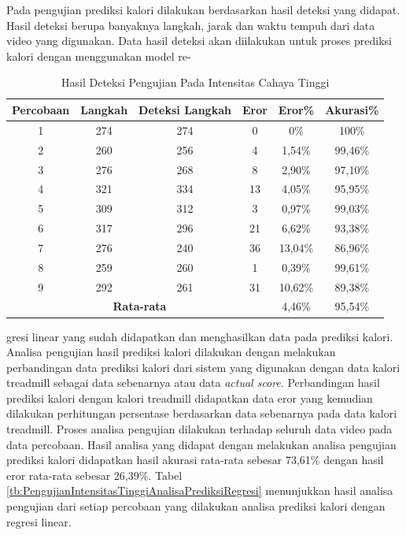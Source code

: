 Pada pengujian prediksi kalori dilakukan berdasarkan hasil deteksi yang didapat. Hasil deteksi berupa banyaknya langkah, jarak dan waktu tempuh dari data video yang digunakan. Data hasil deteksi akan diilakukan untuk proses prediksi kalori dengan menggunakan model re- 

\begin{longtable}{|c|c|c|c|c|c|}
  \caption{Hasil Deteksi Pengujian Pada Intensitas Cahaya Tinggi}
  \label{tb:PengujianIntensitasTinggiAnalisaDeteksi}                                   \\
  \hline
  \rowcolor[HTML]{C0C0C0}
  \textbf{Percobaan} & \textbf{Langkah} & \textbf{Deteksi Langkah} & \textbf{Eror} & \textbf{Eror\%} & \textbf{Akurasi\%} \\
  \hline
  1   & 274   & 274 & 0    & 0\%        & 100\%   \\
  \hline
  2   & 260   & 256 & 4    & 1,54\%     & 99,46\%   \\
  \hline
  3   & 276   & 268 & 8    & 2,90\%     & 97,10\%     \\
  \hline
  4   & 321   & 334 & 13   & 4,05\%     & 95,95\%   \\
  \hline
  5   & 309   & 312 & 3    & 0,97\%     & 99,03\%   \\
  \hline
  6   & 317   & 296 & 21   & 6,62\%     & 93,38\%   \\
  \hline
  7   & 276   & 240 & 36   & 13,04\%    & 86,96\%   \\
  \hline
  8   & 259   & 260 & 1    & 0,39\%     & 99,61\%   \\
  \hline
  9   & 292   & 261 & 31   & 10,62\%    & 89,38\%   \\
  \hline
  

  \multicolumn{4}{|c|}{\textbf{Rata-rata}} & 4,46\% & 95,54\% \\
  \hline
\end{longtable}

\noindent
gresi linear yang sudah didapatkan dan menghasilkan data pada prediksi kalori. Analisa pengujian hasil prediksi kalori dilakukan dengan melakukan perbandingan data prediksi kalori dari sistem yang digunakan dengan data kalori treadmill sebagai data sebenarnya atau data \emph{actual score}. Perbandingan hasil prediksi kalori dengan kalori treadmill didapatkan data eror yang kemudian dilakukan perhitungan persentase berdasarkan data sebenarnya pada data kalori treadmill. Proses analisa pengujian dilakukan terhadap seluruh data video pada data percobaan. Hasil analisa yang didapat dengan melakukan analisa pengujian prediksi kalori didapatkan hasil akurasi rata-rata sebesar 73,61\% dengan hasil eror rata-rata sebesar 26,39\%. Tabel \ref{tb:PengujianIntensitasTinggiAnalisaPrediksiRegresi} menunjukkan hasil analisa pengujian dari setiap percobaan yang dilakukan analisa prediksi kalori dengan regresi linear.

